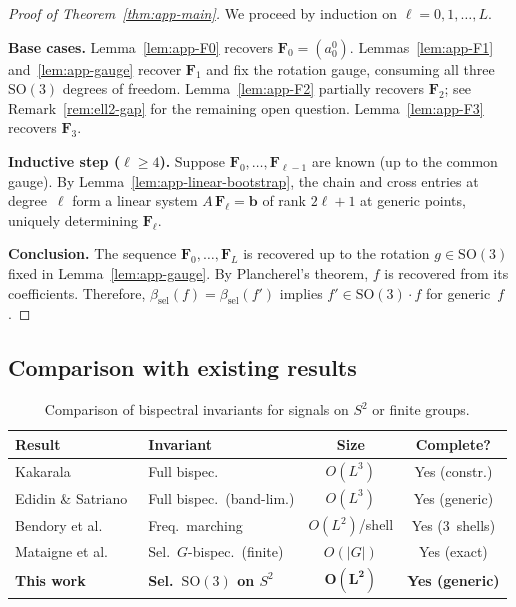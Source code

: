 \documentclass{article}
\newcommand{\SO}{\mathrm{SO}}
\begin{document}
\begin{proof}[Proof of Theorem~\ref{thm:app-main}]
We proceed by induction on $\ell = 0, 1, \dotsc, L$.

\medskip\noindent
\textbf{Base cases.}
Lemma~\ref{lem:app-F0} recovers $\mathbf{F}_0 = (a_0^0)$.
Lemmas~\ref{lem:app-F1} and~\ref{lem:app-gauge} recover $\mathbf{F}_1$
and fix the rotation gauge, consuming all three $\SO(3)$ degrees of
freedom.
Lemma~\ref{lem:app-F2} partially recovers $\mathbf{F}_2$; see
Remark~\ref{rem:ell2-gap} for the remaining open question.
Lemma~\ref{lem:app-F3} recovers $\mathbf{F}_3$.

\medskip\noindent
\textbf{Inductive step ($\ell \ge 4$).}
Suppose $\mathbf{F}_0, \dotsc, \mathbf{F}_{\ell-1}$ are known (up to
the common gauge). By Lemma~\ref{lem:app-linear-bootstrap}, the chain
and cross entries at degree~$\ell$ form a linear system
$A\,\mathbf{F}_\ell = \mathbf{b}$ of rank $2\ell+1$ at generic points,
uniquely determining $\mathbf{F}_\ell$.

\medskip\noindent
\textbf{Conclusion.}
The sequence $\mathbf{F}_0, \dotsc, \mathbf{F}_L$ is recovered up to
the rotation $g \in \SO(3)$ fixed in Lemma~\ref{lem:app-gauge}. By
Plancherel's theorem, $f$ is recovered from its coefficients. Therefore,
$\beta_{\mathrm{sel}}(f) = \beta_{\mathrm{sel}}(f')$ implies
$f' \in \SO(3) \cdot f$ for generic~$f$.
\end{proof}

\subsection{Comparison with existing results}

\begin{table}[h]
  \caption{Comparison of bispectral invariants for signals on $S^2$ or
    finite groups.}
  \label{tab:app-comparison}
  \centering
  \small
  \setlength{\tabcolsep}{4pt}
  \begin{tabular}{@{}l l c c@{}}
    \toprule
    Result & Invariant & Size & Complete? \\
    \midrule
    Kakarala~\citep{kakarala1992triple}
      & Full bispec. & $O(L^3)$ & Yes (constr.) \\
    Edidin \& Satriano~\citep{edidin2023orbit}
      & Full bispec.\ (band-lim.)
      & $O(L^3)$ & Yes (generic) \\
    Bendory et al.~\citep{bendory2022bispectrum}
      & Freq.\ marching
      & $O(L^2)$/shell & Yes (3~shells) \\
    Mataigne et al.~\citep{mataigne2024selective}
      & Sel.\ $G$-bispec.\ (finite)
      & $O(|G|)$ & Yes (exact) \\
    \textbf{This work}
      & \textbf{Sel.\ $\SO(3)$ on $S^2$}
      & $\boldsymbol{O(L^2)}$ & \textbf{Yes (generic)} \\
    \bottomrule
  \end{tabular}
\end{table}
\end{document}
